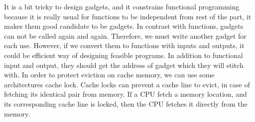 		It is a bit tricky to design gadgets, and it constrains functional programming because it is really usual for functions to be independent from rest of the part, it makes them good candidate to be gadgets. In contrast with functions, gadgets can not be called again and again. Therefore, we must write another gadget for each use. However, if we convert them to functions with inputs and outputs, it could be efficient way of designing feasible programs. In addition to functional input and output, they should get the address of gadget which they will stitch with. In order to protect eviction on cache memory, we can use some architectures cache lock. Cache locks can prevent a cache line to evict, in case of fetching its identical pair from memory. If a CPU fetch a memory location, and its corresponding cache line is locked, then the CPU fetches it directly from the memory.